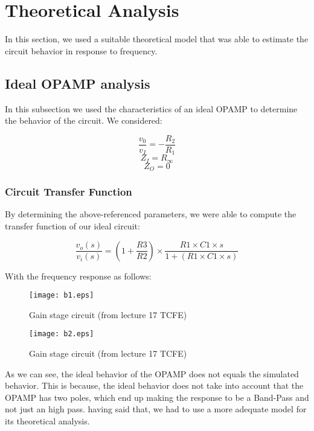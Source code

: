 \section{Theoretical Analysis}
\label{sec:analysis}

In this section, we used a suitable theoretical model that was able to estimate the  circuit behavior in response to frequency.

\subsection{Ideal OPAMP analysis}

In this subsection we used the characteristics of an ideal OPAMP to determine the behavior of the circuit. We considered:

\begin{equation}
   \frac{v_0}{v_I} = - \frac{R_2}{R_1} 
\end{equation}
\begin{equation}
   Z_I = R_\infty
\end{equation}
\begin{equation}
   Z_O = 0
\end{equation}

\subsubsection{Circuit Transfer Function}

By determining the above-referenced parameters, we were able to compute the transfer function of our ideal circuit:

\begin{equation}
   \frac{v_o(s)}{v_i(s)} =\left(1 + \frac{R3}{R2}\right) \times \frac{R1 \times C1 \times s}{1 + (R1 \times C1 \times s)}
\end{equation}

With the frequency response as follows: 

\begin{figure}[H] \centering
\texttt{[image: b1.eps]}
\caption{Gain stage circuit (from lecture 17 TCFE) }
\label{fig:rc2}
\end{figure} 

\begin{figure}[H] \centering
\texttt{[image: b2.eps]}
\caption{Gain stage circuit (from lecture 17 TCFE) }
\label{fig:rc2}
\end{figure} 

As we can see, the ideal behavior of the OPAMP does not equals the simulated behavior. This is because, the ideal behavior does not take into account that the OPAMP has two poles, which end up making the response to be a Band-Pass and not just an high pass. having said that, we had to use a more adequate model for its theoretical analysis. 

